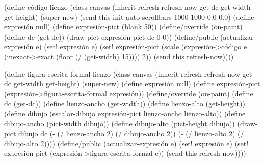 \documentclass[10pt,oneside,openany,letterpaper]{book}
\begin{document}
(define código-lienzo%
  (class canvas%
    (inherit refresh refresh-now get-dc get-width get-height)
    (super-new)
    (send this init-auto-scrollbars 1000 1000 0.0 0.0)
    (define expresión null)
    (define expresión-pict (blank 50))
    (define/override (on-paint)
      (define dc (get-dc))
      (draw-pict expresión-pict dc 0 0))
    (define/public (actualizar-expresión e)
      (set! expresión e)
      (set! expresión-pict
            (scale (expresión->código e (inexact->exact (floor (/ (get-width) 15)))) 2))
      (send this refresh-now))))

(define figura-escrita-formal-lienzo%
  (class canvas%
    (inherit refresh refresh-now get-dc get-width get-height)
    (super-new)
    (define expresión null)
    (define expresión-pict (expresión->figura-escrita-formal expresión))
    (define/override (on-paint)
      (define dc (get-dc))
      (define lienzo-ancho (get-width))
      (define lienzo-alto (get-height))
      (define dibujo (escalar-dibujo expresión-pict
                                     lienzo-ancho lienzo-alto))
      (define dibujo-ancho (pict-width dibujo))
      (define dibujo-alto (pict-height dibujo))
      (draw-pict dibujo dc
                 (- (/ lienzo-ancho 2) (/ dibujo-ancho 2))
                 (- (/ lienzo-alto 2) (/ dibujo-alto 2))))
    (define/public (actualizar-expresión e)
      (set! expresión e)
      (set! expresión-pict
            (expresión->figura-escrita-formal e))
      (send this refresh-now))))
\end{document}
